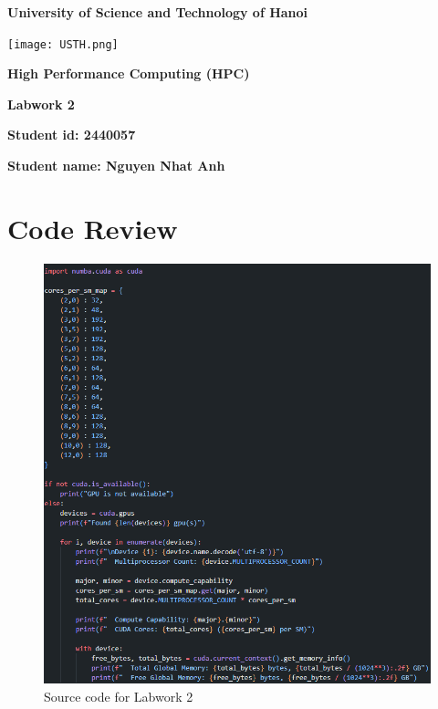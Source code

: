 \documentclass[12pt]{article}
\begin{document}
\thispagestyle{empty}
\begin{center}
    \vspace{7pt}
    \fontsize{18pt}{17pt}\selectfont 
    \textbf{University of Science and Technology of Hanoi}
    \vspace{7pt}
\end{center}
\vspace{10pt}
\begin{center}
    \texttt{[image: USTH.png]}
\end{center}

\vspace{90pt}

\begin{center}
    \fontsize{30pt}{17pt}\selectfont 
    \textbf{High Performance Computing (HPC)}\\[3em]
    \vspace{50pt}

    \fontsize{20pt}{17pt}\selectfont 
    \textbf{Labwork 2}
    \vspace{50pt}


    \fontsize{17pt}{17pt}\selectfont
    \textbf{{Student id: }{2440057}}
    \vspace{15pt}

    \fontsize{17pt}{17pt}\selectfont
    \textbf{{Student name: }{Nguyen Nhat Anh}}
    \vspace{15pt}
    
\end{center}

\newpage

\section{Code Review}
\begin{figure}[H]
    \centering
    \includegraphics[width=\linewidth]{images/code.png}
    \caption{Source code for Labwork 2}
    \label{fig:code}
\end{figure}
\end{document}
